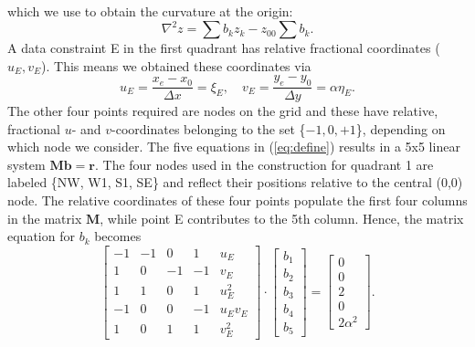 \documentclass[12pt,letterpaper,margin=0.5in]{article}
\newcommand{\PDFfig}[4][tbp]{\begin{figure}[#1] \centering \epsfig{figure=#2,width=#4} \caption{{\small #3}} \label{fig:#2} \end{figure}}
\begin{document}
which we use to obtain the curvature at the origin:
\begin{equation}
	\nabla^2 z = \sum b_k z_k - z_{00}\sum b_k.
\end{equation}
A data constraint E in the first quadrant has relative fractional coordinates ($u_E, v_E$).  This means
we obtained these coordinates via
\begin{equation}
	u_E = \frac{x_e - x_0}{\Delta x} = \xi_E, \quad v_E = \frac{y_e - y_0}{\Delta y} = \alpha \eta_E.
\end{equation}
The other four points required are
nodes on the grid and these have relative, fractional $u$- and $v$-coordinates belonging to the set \{$-1, 0, +1$\},
depending on which node we consider. The five equations in (\ref{eq:define}) results in a 5x5 linear system $\mathbf{Mb} = \mathbf{r}$.
The four nodes used in the construction for quadrant 1 are labeled \{NW, W1, S1, SE\}
and reflect their positions relative to the central (0,0) node.
The relative coordinates of these four points populate the first four columns in the matrix $\mathbf{M}$, while point E
contributes to the 5th column. Hence, the matrix equation
for $b_k$ becomes
\begin{equation}
\left[ {\begin{array}{*{20}{r}}
{ - 1}&{ - 1}&0&1&{{u_E}}\\
1&0&{ - 1}&{ - 1}&{{v_E}}\\
1&1&0&1&{u_E^2}\\
{ - 1}&0&0&{ - 1}&{{u_E}{v_E}}\\
1&0&1&1&{v_E^2}
\end{array}} \right] \cdot \left[ {\begin{array}{*{20}{c}}
{{b_1}}\\
{{b_2}}\\
{{b_3}}\\
{{b_4}}\\
{{b_5}}
\end{array}} \right] = \left[ {\begin{array}{*{20}{c}}
0\\
0\\
2\\
0\\
2\alpha^2
\end{array}} \right].
\end{equation}
\end{document}
